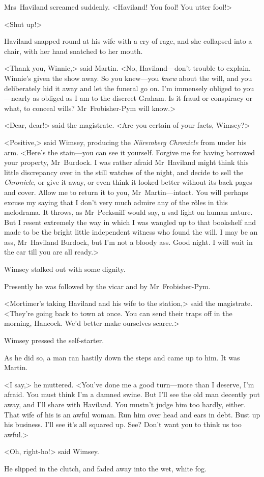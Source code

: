 Mrs~Haviland screamed suddenly. <Haviland! You fool! You utter fool!>

<Shut up!>

Haviland snapped round at his wife with a cry of rage, and she collapsed into a chair, with her hand snatched to her mouth.

<Thank you, Winnie,> said Martin. <No, Haviland—don't trouble to explain. Winnie's given the show away. So you knew—you \textit{knew} about the will, and you deliberately hid it away and let the funeral go on. I'm immensely obliged to you—nearly as obliged as I am to the discreet Graham. Is it fraud or conspiracy or what, to conceal wills? Mr~Frobisher-Pym will know.>

<Dear, dear!> said the magistrate. <Are you certain of your facts, Wimsey?>

<Positive,> said Wimsey, producing the \textit{Nüremberg Chronicle} from under his arm. <Here's the stain—you can see it yourself. Forgive me for having borrowed your property, Mr~Burdock. I was rather afraid Mr~Haviland might think this little discrepancy over in the still watches of the night, and decide to sell the \textit{Chronicle}, or give it away, or even think it looked better without its back pages and cover. Allow me to return it to you, Mr~Martin—intact. You will perhaps excuse my saying that I don't very much admire any of the rôles in this melodrama. It throws, as Mr~Pecksniff would say, a sad light on human nature. But I resent extremely the way in which I was wangled up to that bookshelf and made to be the bright little independent witness who found the will. I may be an ass, Mr~Haviland Burdock, but I'm not a bloody ass. Good night. I will wait in the car till you are all ready.>

Wimsey stalked out with some dignity.

Presently he was followed by the vicar and by Mr~Frobisher-Pym.

<Mortimer's taking Haviland and his wife to the station,> said the magistrate. <They're going back to town at once. You can send their traps off in the morning, Hancock. We'd better make ourselves scarce.>

Wimsey pressed the self-starter.

As he did so, a man ran hastily down the steps and came up to him. It was Martin.

<I say,> he muttered. <You've done me a good turn—more than I deserve, I'm afraid. You must think I'm a damned swine. But I'll see the old man decently put away, and I'll share with Haviland. You mustn't judge him too hardly, either. That wife of his is an awful woman. Run him over head and ears in debt. Bust up his business. I'll see it's all squared up. See? Don't want you to think us too awful.>

<Oh, right-ho!> said Wimsey.

He slipped in the clutch, and faded away into the wet, white fog.